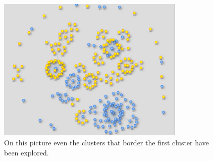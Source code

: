 \documentclass[runningheads]{llncs}
\begin{document}
\begin{figure}[H]
\centering
  \includegraphics[width=0.8\textwidth]{step3.png}
  \caption{On this picture even the clusters that border the first cluster have been explored.}
\end{figure}

 
 
\end{document}
